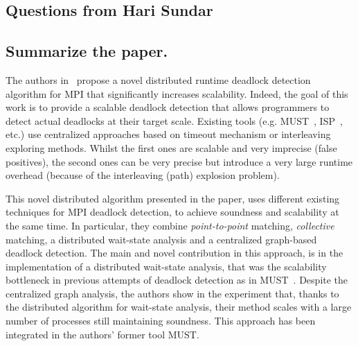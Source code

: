 


\begin{refsection}
\section{Questions from Hari Sundar}
\label{sec:member3}

\subsection*{Summarize the paper.}
\label{sec:member31}

The authors in~\cite{Hilbrich:2013:DWS:2503210.2503237} propose a novel
distributed runtime deadlock detection algorithm for MPI that significantly
increases scalability.
%
Indeed, the goal of this work is to provide a scalable deadlock detection that
allows programmers to detect actual deadlocks at their target scale.
%
Existing tools (e.g. MUST~\cite{hilbrich2010must},
ISP~\cite{DBLP:conf/ptw/VoVG09}, etc.) use centralized approaches based on
timeout mechanism or interleaving exploring methods.
%
Whilst the first ones are scalable and very imprecise (false positives), the
second ones can be very precise but introduce a very large runtime overhead
(because of the interleaving (path) explosion problem).

This novel distributed algorithm presented in the paper, uses different
existing techniques for MPI deadlock detection, to achieve soundness and
scalability at the same time.
%
In particular, they combine \emph{point-to-point} matching, \emph{collective}
matching, a distributed wait-state analysis and a centralized graph-based
deadlock detection.
%
The main and novel contribution in this approach, is in the implementation of
a distributed wait-state analysis, that was the scalability bottleneck in
previous attempts of deadlock detection as in MUST~\cite{hilbrich2013runtime}.
%
Despite the centralized graph analysis, the authors show in the experiment
that, thanks to the distributed algorithm for wait-state analysis, their
method scales with a large number of processes still maintaining soundness.
%
This approach has been integrated in the authors' former tool MUST.


\end{refsection}
